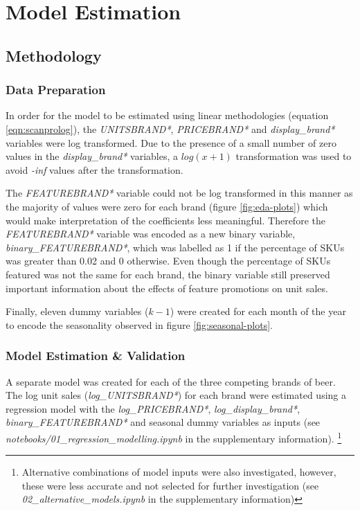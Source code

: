 \documentclass[a4paper,11pt]{article}
\begin{document}
\newpage

\section{Model Estimation}
\subsection{Methodology}

\subsubsection{Data Preparation}
In order for the model to be estimated using linear methodologies (equation \ref{eqn:scanprolog}), the \textit{UNITSBRAND*}, \textit{PRICEBRAND*} and \textit{display\_brand*} variables were log transformed. Due to the presence of a small number of zero values in the \textit{display\_brand*} variables, a $log(x+1)$ transformation \citep{wooldridge_multiple_2016} was used to avoid \textit{-inf} values after the transformation.

The \textit{FEATUREBRAND*} variable could not be log transformed in this manner as the majority of values were zero for each brand (figure \ref{fig:eda-plots}) which would make interpretation of the coefficients less meaningful. Therefore the \textit{FEATUREBRAND*} variable was encoded as a new binary variable, \textit{binary\_FEATUREBRAND*}, which was labelled as 1 if the percentage of SKUs was greater than 0.02 and 0 otherwise. Even though the percentage of SKUs featured was not the same for each brand, the binary variable still preserved important information about the effects of feature promotions on unit sales.

Finally, eleven dummy variables ($k-1$) were created for each month of the year to encode the seasonality observed in figure \ref{fig:seasonal-plots}.


\subsubsection{Model Estimation \& Validation}
A separate model was created for each of the three competing brands of beer. The log unit sales (\textit{log\_UNITSBRAND*}) for each brand were estimated using a regression model with the \textit{log\_PRICEBRAND*}, \textit{log\_display\_brand*}, \textit{binary\_FEATUREBRAND*} and seasonal dummy variables as inputs (see \textit{notebooks/01\_regression\_modelling.ipynb} in the supplementary information). \footnote{Alternative combinations of model inputs were also investigated, however, these were less accurate and not selected for further investigation (see \textit{02\_alternative\_models.ipynb} in the supplementary information)}
\end{document}

